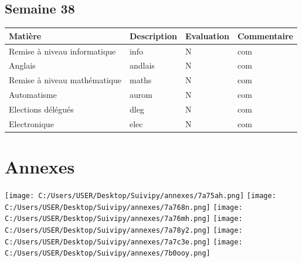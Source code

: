 \documentclass[12pt, openany]{report}
\begin{document}
\section*{Semaine 38}
\begin{tabular}{|l|l|l|l|}
\hline
Matière & Description & Evaluation & Commentaire \\ 
\hline
Remise à niveau informatique & info & N & com \\ 
\hline
Anglais & andlais & N & com \\ 
\hline
Remise à niveau mathématique & maths & N & com \\ 
\hline
Automatisme & aurom & N & com \\ 
\hline
Elections délégués & dleg & N & com \\ 
\hline
Electronique & elec & N & com \\ 
\hline
\end{tabular}

\chapter{Annexes}

\texttt{[image: C:/Users/USER/Desktop/Suivipy/annexes/7a75ah.png]}
\texttt{[image: C:/Users/USER/Desktop/Suivipy/annexes/7a768n.png]}
\texttt{[image: C:/Users/USER/Desktop/Suivipy/annexes/7a76mh.png]}
\texttt{[image: C:/Users/USER/Desktop/Suivipy/annexes/7a78y2.png]}
\texttt{[image: C:/Users/USER/Desktop/Suivipy/annexes/7a7c3e.png]}
\texttt{[image: C:/Users/USER/Desktop/Suivipy/annexes/7b0ooy.png]}
\end{document}
